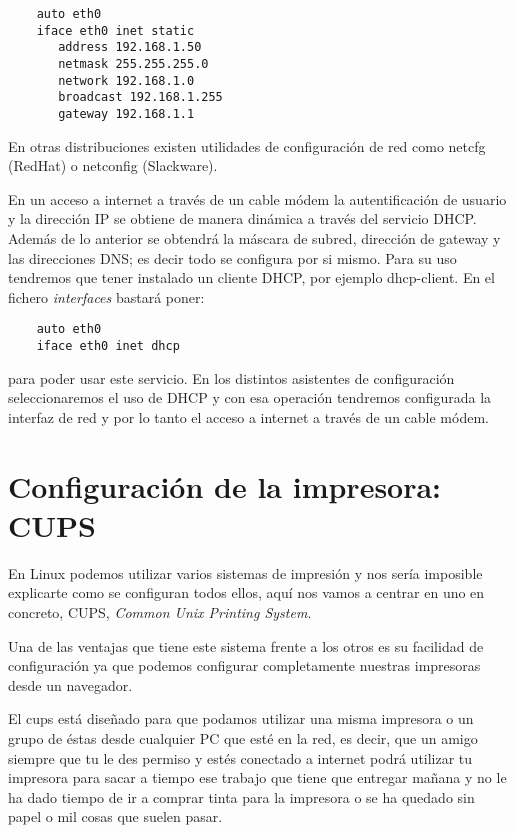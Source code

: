 \begin{verbatim}
	auto eth0
	iface eth0 inet static
	   address 192.168.1.50
	   netmask 255.255.255.0
	   network 192.168.1.0
	   broadcast 192.168.1.255
	   gateway 192.168.1.1
\end{verbatim}

En  otras distribuciones  existen utilidades  de configuración  de red
como netcfg (RedHat) o netconfig (Slackware).

En un acceso a internet a  través de un cable módem la autentificación
de usuario  y la dirección IP  se obtiene de manera  dinámica a través
del servicio  DHCP. Además de  lo anterior  se obtendrá la  máscara de
subred, dirección de  gateway y las direcciones DNS; es  decir todo se
configura por si  mismo. Para su uso tendremos que  tener instalado un
cliente DHCP, por ejemplo dhcp-client.  En el fichero {\em interfaces}
bastará poner:

\begin{verbatim}
	auto eth0
	iface eth0 inet dhcp
\end{verbatim}

para  poder  usar  este  servicio.  En  los  distintos  asistentes  de
configuración  seleccionaremos el  uso  de DHCP  y  con esa  operación
tendremos configurada  la interfaz de red  y por lo tanto  el acceso a
internet a través de un cable módem.


\section{Configuración de la impresora: CUPS}

En Linux  podemos utilizar  varios sistemas de  impresión y  nos sería
imposible explicarte como se configuran  todos ellos, aquí nos vamos a
centrar en uno en concreto, CUPS, {\em Common Unix Printing System}.

Una de las  ventajas que tiene este  sistema frente a los  otros es su
facilidad  de configuración  ya que  podemos configurar  completamente
nuestras impresoras desde un navegador.

El cups está diseñado para que  podamos utilizar una misma impresora o
un grupo de éstas desde cualquier PC que esté en la red, es decir, que
un amigo  siempre que tu le  des permiso y estés  conectado a internet
podrá utilizar tu impresora para sacar  a tiempo ese trabajo que tiene
que entregar mañana y no le ha  dado tiempo de ir a comprar tinta para
la impresora o se ha quedado sin papel o mil cosas que suelen pasar.


